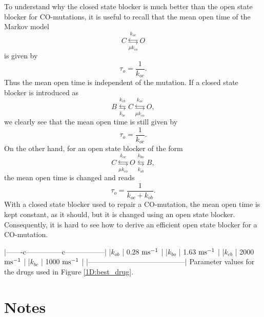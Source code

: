 To understand why the closed state blocker is much better than the open state blocker for CO-mutations, it is useful to recall that the mean open time of the Markov model
\begin{equation}
C\underset{\mu k_{co}}{\overset{k_{oc}}{\leftrightarrows}}O \label{Markov111}
\end{equation}
is given by
\[ \tau_o=\frac{1}{k_{oc}}. \]
Thus the mean open time is independent of the mutation. If a closed state blocker is introduced as
\begin{equation}
B\underset{k_{bc}}{\overset{k_{cb}}{\leftrightarrows}}C\underset{\mu
k_{co}}{\overset{k_{oc}}{\leftrightarrows}}O, 
\end{equation}
we clearly see that the mean open time is still given by
\[ \tau_o=\frac{1}{k_{oc}}. \]
On the other hand, for an open state blocker of the form
\begin{equation}
C\underset{ \mu k_{co}}{\overset{k_{oc}}{\leftrightarrows}}O\underset{k_{ob}
}{\overset{k_{bo}}{\leftrightarrows}}B,
\end{equation}
the mean open time is changed and reads
\[ \tau_o=\frac{1}{k_{oc}+k_{ob}}. \]
With a closed state blocker used to repair a CO-mutation, the mean open time is kept constant, as it should, but it is changed using an open state blocker. Consequently, it is hard to see how to derive an efficient open state blocker for a CO-mutation.

|-------c---------------c-----------------|
|$k_{ob} $     | 0.28 $\rm{ms^{-1}}$      |
|$k_{bo} $     | 1.63 $\rm{ms^{-1}}$      |
|$k_{cb} $     | 2000 $\rm{ms^{-1}}$      |
|$k_{bc} $     | 1000 $\rm{ms^{-1}}$      |
|-----------------------------------------|
Parameter values for the drugs used in Figure \ref{1D:best_drug}. \label{tab:drug}
\clearpage

\section{Notes}
\label{notesdrugs}

